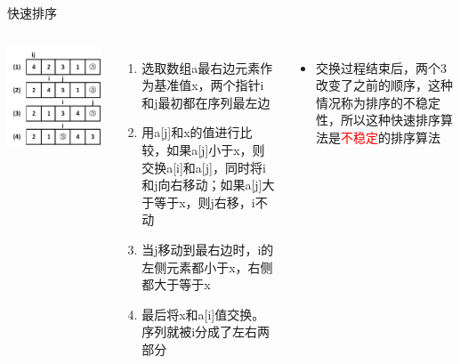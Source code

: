 \begin{frame}{快速排序}
    \begin{columns}
            \includegraphics[width=\textwidth]{fig/2-4.png}
        \begin{enumerate}[(1)]
            \item 选取数组a最右边元素作为基准值x，两个指针i和j最初都在序列最左边
            \pause
            \item 用a[j]和x的值进行比较，如果a[j]小于x，则交换a[i]和a[j]，同时将i和j向右移动；如果a[j]大于等于x，则j右移，i不动
            \pause
            \item 当j移动到最右边时，i的左侧元素都小于x，右侧都大于等于x
            \pause
            \item 最后将x和a[i]值交换。序列就被i分成了左右两部分
            \pause
        \end{enumerate}
        \begin{itemize}
            \item 交换过程结束后，两个3改变了之前的顺序，这种情况称为排序的不稳定性，所以这种快速排序算法是\textcolor{red}{不稳定}的排序算法
        \end{itemize}
    \end{columns}
\end{frame}
